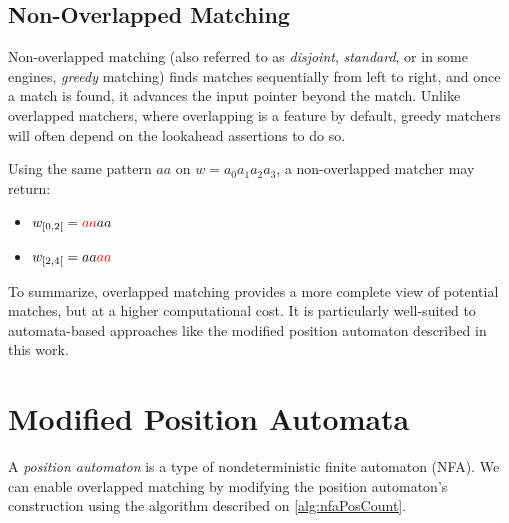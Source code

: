 \subsection*{Non-Overlapped Matching}
Non-overlapped matching (also referred to as \emph{disjoint}, \emph{standard}, or in some engines, \emph{greedy} matching) finds matches sequentially from left to right, and once a match is found, it advances the input pointer beyond the match. Unlike overlapped matchers, where overlapping is a feature by default, greedy matchers will often depend on the lookahead assertions to do so.

Using the same pattern $aa$ on $w = a_0 a_1 a_2 a_3$, a non-overlapped matcher may return:

\begin{itemize}
	\item $w_{[0,2[} = {\color{red}{aa}}aa$
	\item $w_{[2,4[} = aa{\color{red}{aa}}$
\end{itemize}

To summarize, overlapped matching provides a more complete view of potential matches, but at a higher computational cost. It is particularly well-suited to automata-based approaches like the modified position automaton described in this work.


\section{Modified Position Automata}
A \emph{position automaton} is a type of nondeterministic finite automaton (NFA).
We can enable overlapped matching by modifying the position automaton's construction using the algorithm described on  \ref{alg:nfaPosCount}.

